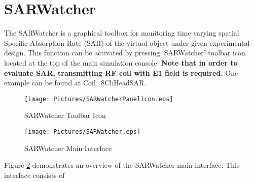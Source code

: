 \documentclass{book}%
\begin{document}
\section{SARWatcher}

The SARWatcher is a graphical toolbox for monitoring time varying spatial Specific Absorption Rate (SAR) of the virtual object under given experimental design. This function can be activated by pressing `SARWatcher' toolbar icon located at the top of the main simulation console. \textbf{Note that in order to evaluate SAR, transmitting RF coil with E1 field is required.} One example can be found at Coil\_8ChHeadSAR.


\begin{figure}[htbp]
	\centering
		\texttt{[image: Pictures/SARWatcherPanelIcon.eps]}
	\caption{SARWatcher Toolbar Icon}
	\label{fig:SARWatcherPanelIcon}
\end{figure}

\begin{figure}[htbp]
	\centering
		\texttt{[image: Pictures/SARWatcher.eps]}
	\caption{SARWatcher Main Interface}
	\label{fig:SARWatcher}
\end{figure}

Figure \ref{fig:SARWatcher} demonstrates an overview of the SARWatcher main interface. This interface consists of 
\end{document}
